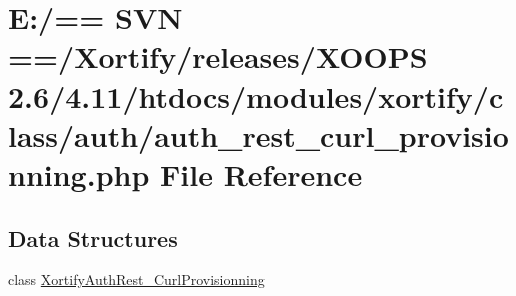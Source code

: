 \hypertarget{auth__rest__curl__provisionning_8php}{\section{E\-:/== S\-V\-N ==/\-Xortify/releases/\-X\-O\-O\-P\-S 2.6/4.11/htdocs/modules/xortify/class/auth/auth\-\_\-rest\-\_\-curl\-\_\-provisionning.php File Reference}
\label{auth__rest__curl__provisionning_8php}
}
\subsection*{Data Structures}
\begin{DoxyCompactItemize}
\item 
class \hyperlink{class_xortify_auth_rest___curl_provisionning}{Xortify\-Auth\-Rest\-\_\-\-Curl\-Provisionning}
\end{DoxyCompactItemize}
